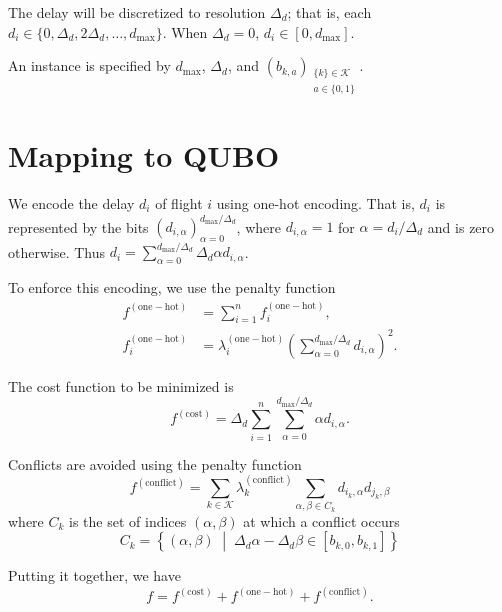 \documentclass[twocolumn]{article}
\newcommand{\func}[1]{f^{(\mathrm{#1})}}
\newcommand{\penweight}[1]{\lambda^{(\mathrm{#1})}}
\newcommand{\dmax}{d_{\max}}
\begin{document}
The delay will be discretized to resolution $\Delta_d$; that is, each $d_i \in \{0, \Delta_d, 2\Delta_d, \ldots, \dmax\}$.
When $\Delta_d = 0$, $d_i \in [0, \dmax]$.

An instance is specified by $\dmax$, $\Delta_d$, and ${\left(b_{k, a}\right)}_{\substack{\{k\} \in \mathcal{K} \\ a \in \{0, 1\}}}$.

\section{Mapping to QUBO}

We encode the delay $d_i$ of flight $i$ using one-hot encoding.
That is, $d_i$ is represented by the bits 
${\left( d_{i,\alpha}\right)}_{\alpha=0}^{\dmax/\Delta_d}$, where $d_{i,\alpha} = 1$ for $\alpha = d_i / \Delta_d$ and is zero otherwise.
Thus $d_i = \sum_{\alpha=0}^{\dmax / \Delta_d} \Delta_d \alpha d_{i,\alpha}$.

To enforce this encoding, we use the penalty function
\begin{align}
\func{one-hot} 
&= \sum_{i = 1}^n \func{one-hot}_i,  \\
\func{one-hot}_i 
&= 
\penweight{one-hot}_i 
{\left(\sum_{\alpha = 0}^{\dmax / \Delta_d} d_{i, \alpha}\right)}^2.
\end{align}

The cost function to be minimized is 
\begin{equation}
\func{cost} = 
\Delta_d \sum_{i = 1}^n \sum_{\alpha = 0}^{\dmax / \Delta_d} \alpha d_{i, \alpha}.
\end{equation}

Conflicts are avoided using the penalty  function
\begin{equation}
\func{conflict} = 
    \sum_{k \in \mathcal{K}}
\penweight{conflict}_k
\sum_{\alpha, \beta \in C_k} d_{i_k,\alpha} d_{j_k, \beta} 
\end{equation}
where $C_k$ is the set of indices $(\alpha, \beta)$ at which a conflict occurs
\begin{equation*}
    C_k = \left\{(\alpha, \beta) \; \middle| \; \Delta_d \alpha - \Delta_d \beta \in [b_{k,0}, b_{k,1}] \right\}
\end{equation*}

Putting it together, we have
\begin{equation}
  f = \func{cost} + \func{one-hot} + \func{conflict}.
\end{equation}
\end{document}
